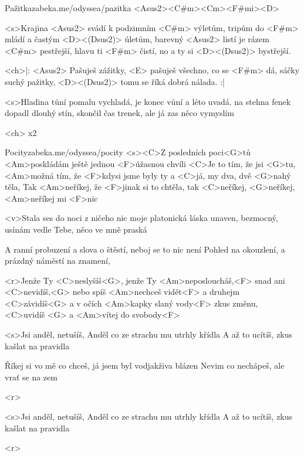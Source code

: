 \begin{song}{47}{Pažitka}{zabeka.me/odyssea/pazitka}
	<Asus2><C#m><Cm><F#mi><D>

	<s>Krajina <Asus2> svádí k podzimním <C#m> výletům,
	tripům do <F#m> mládí a častým <D><(Dsus2)> úletům,
	barevný <Asus2> listí je rázem <C#m> pestřejší,
	hlavu ti <F#m> čistí, no a ty si <D><(Dsus2)> bystřejší.

	<ch>|: <Asus2> Pašuješ zážitky,
	<E> pašuješ všechno, co se <F#m> dá,
	sáčky suchý pažitky,
	<D><(Dsus2)> tomu se říká dobrá nálada. :|

	<s>Hladina tůní pomalu vychladá,
	je konec vůní a léto uvadá.
	na stehna fenek dopadl dlouhý stín,
	skončil čas trenek, ale já zas něco vymyslím

	<ch>
	x2


\end{song}
\begin{song}{48}{Pocity}{zabeka.me/odyssea/pocity}
	<s><C>Z posledních poci<G>tů
	<Am>poskládám ještě jednou <F>úžasnou chvíli
	<C>Je to tím, že jsi <G>tu,
	<Am>možná tím, že <F>kdysi jsme byly ty a <C>já,
	my dva, dvě <G>nahý těla,
	Tak <Am>neříkej, že <F>jinak si to chtěla,
	tak <C>neříkej,
	<G>neříkej, <Am>neříkej mi <F>nic

	<v>Stala ses do noci
	z ničeho nic moje platonická láska
	unaven, bezmocný,
	usínám vedle Tebe, něco ve mně praská

	A ranní probuzení
	a slova o štěstí, neboj se to nic není
	Pohled na okouzlení,
	a prázdný náměstí na znamení,

	<r>Jenže Ty <C>neslyšíš<G>,
	jenže Ty <Am>neposloucháš,<F>
	snad ani <C>nevidíš,<G>
	nebo spíš <Am>nechceš vidět<F>
	a druhejm <C>závidíš<G>
	a v očích <Am>kapky slaný vody<F>
	zkus změnu, <C>uvidíš <G>
	a <Am>vítej do svobody<F>

	<s>Jsi anděl, netušíš,
	Anděl co ze strachu mu utrhly křídla
	A až to ucítíš, zkus kašlat na pravidla

	Říkej si vo mě co chceš,
	já jsem byl vodjakživa blázen
	Nevim co nechápeš,
	ale vrať se na zem

	<r>

	<s>Jsi anděl, netušíš,
	Anděl co ze strachu mu utrhly křídla
	A až to ucítíš, zkus kašlat na pravidla

	<r>

\end{song}
